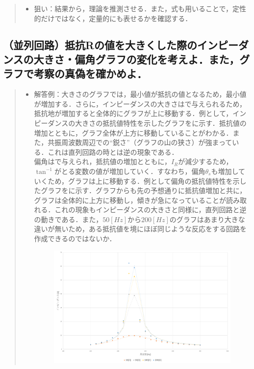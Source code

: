 \documentclass[11pt,dvipdfmx]{jarticle}
\begin{document}
\begin{quote}
\begin{itemize}
\item 狙い：結果から，理論を推測させる．また，式も用いることで，定性的だけではなく，定量的にも表せるかを確認する．
\end{itemize}
\end{quote}


\subsection{（並列回路）抵抗Rの値を大きくした際のインピーダンスの大きさ・偏角グラフの変化を考えよ．また，グラフで考察の真偽を確かめよ．}
\begin{quote}
\begin{itemize}
\item 解答例：大きさのグラフでは，最小値が抵抗の値となるため，最小値が増加する．さらに，インピーダンスの大きさはで与えられるため，抵抗地が増加すると全体的にグラフが上に移動する．例として，インピーダンスの大きさの抵抗値特性を示したグラフをに示す．抵抗値の増加とともに，グラフ全体が上方に移動していることがわかる．また，共振周波数周辺での``鋭さ''（グラフの山の狭さ）が強まっている．これは直列回路の時とは逆の現象である．\\
偏角はで与えられ，抵抗値の増加とともに，$I_{R}$が減少するため，$\tan^{-1}$がとる変数の値が増加していく．すなわち，偏角$\theta_{s}$も増加していくため，グラフは上に移動する．例として偏角の抵抗値特性を示したグラフをに示す．グラフからも先の予想通りに抵抗値増加と共に，グラフは全体的に上方に移動し，傾きが急になっていることが読み取れる．これの現象もインピーダンスの大きさと同様に，直列回路と逆の動きである．また，$50[Hz]$から$200[Hz]$のグラフはあまり大きな違いが無いため，ある抵抗値を境にほぼ同じような反応をする回路を作成できるのではないか．
\begin{figure}
 \centering
 \includegraphics[scale=0.45]{./fig/graph7.pdf}

\end{figure}
\end{itemize}
\end{quote}
\end{document}
